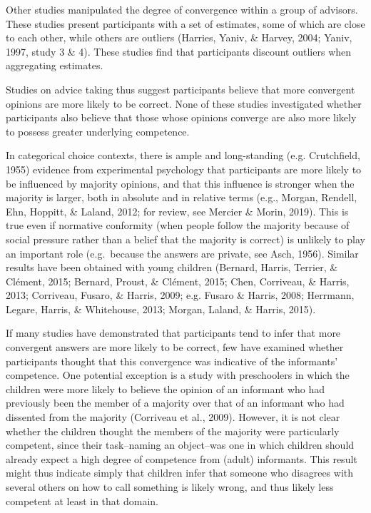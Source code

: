 \documentclass[
  doc,floatsintext]{apa6}
\begin{document}
Other studies manipulated the degree of convergence within a group of advisors. These studies present participants with a set of estimates, some of which are close to each other, while others are outliers (Harries, Yaniv, \& Harvey, 2004; Yaniv, 1997, study 3 \& 4). These studies find that participants discount outliers when aggregating estimates.

Studies on advice taking thus suggest participants believe that more convergent opinions are more likely to be correct. None of these studies investigated whether participants also believe that those whose opinions converge are also more likely to possess greater underlying competence.

In categorical choice contexts, there is ample and long-standing (e.g. Crutchfield, 1955) evidence from experimental psychology that participants are more likely to be influenced by majority opinions, and that this influence is stronger when the majority is larger, both in absolute and in relative terms (e.g., Morgan, Rendell, Ehn, Hoppitt, \& Laland, 2012; for review, see Mercier \& Morin, 2019). This is true even if normative conformity (when people follow the majority because of social pressure rather than a belief that the majority is correct) is unlikely to play an important role (e.g.~because the answers are private, see Asch, 1956). Similar results have been obtained with young children (Bernard, Harris, Terrier, \& Clément, 2015; Bernard, Proust, \& Clément, 2015; Chen, Corriveau, \& Harris, 2013; Corriveau, Fusaro, \& Harris, 2009; e.g. Fusaro \& Harris, 2008; Herrmann, Legare, Harris, \& Whitehouse, 2013; Morgan, Laland, \& Harris, 2015).

If many studies have demonstrated that participants tend to infer that more convergent answers are more likely to be correct, few have examined whether participants thought that this convergence was indicative of the informants' competence. One potential exception is a study with preschoolers in which the children were more likely to believe the opinion of an informant who had previously been the member of a majority over that of an informant who had dissented from the majority (Corriveau et al., 2009). However, it is not clear whether the children thought the members of the majority were particularly competent, since their task--naming an object--was one in which children should already expect a high degree of competence from (adult) informants. This result might thus indicate simply that children infer that someone who disagrees with several others on how to call something is likely wrong, and thus likely less competent at least in that domain.
\end{document}
